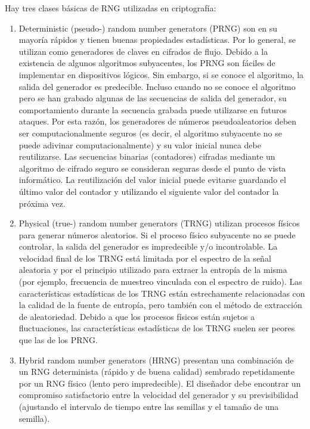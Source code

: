 			
			Hay tres clases básicas de RNG utilizadas en criptografía:
			
			\begin{enumerate}
				\item Deterministic (pseudo-) random number generators (PRNG) son en su mayoría rápidos y tienen buenas propiedades estadísticas. Por lo general, se utilizan como generadores de claves en cifrados de flujo. Debido a la existencia de algunos algoritmos subyacentes, los PRNG son fáciles de implementar en dispositivos lógicos. Sin embargo, si se conoce el algoritmo, la salida del generador es predecible. Incluso cuando no se conoce el algoritmo pero se han grabado algunas de las secuencias de salida del generador, su comportamiento durante la secuencia grabada puede utilizarse en futuros ataques. Por esta razón, los generadores de números pseudoaleatorios deben ser computacionalmente seguros (es decir, el algoritmo subyacente no se puede adivinar computacionalmente) y su valor inicial nunca debe reutilizarse. Las secuencias binarias (contadores) cifradas mediante un algoritmo de cifrado seguro se consideran seguras desde el punto de vista informático. La reutilización del valor inicial puede evitarse guardando el último valor del contador y utilizando el siguiente valor del contador la próxima vez.			
					
				
				\item Physical (true-) random number generators (TRNG) utilizan procesos físicos para generar números aleatorios. Si el proceso físico subyacente no se puede controlar, la salida del generador es impredecible y/o incontrolable. La velocidad final de los TRNG está limitada por el espectro de la señal aleatoria y por el principio utilizado para extraer la entropía de la misma (por ejemplo, frecuencia de muestreo vinculada con el espectro de ruido). Las características estadísticas de los TRNG están estrechamente relacionadas con la calidad de la fuente de entropía, pero también con el método de extracción de aleatoriedad. Debido a que los procesos físicos están sujetos a fluctuaciones, las características estadísticas de los TRNG suelen ser peores que las de los PRNG.
				
				\item Hybrid random number generators (HRNG) presentan una combinación de un RNG determinista (rápido y de buena calidad) sembrado repetidamente por un RNG físico (lento pero impredecible). El diseñador debe encontrar un compromiso satisfactorio entre la velocidad del generador y su previsibilidad (ajustando el intervalo de tiempo entre las semillas y el tamaño de una semilla).
			\end{enumerate}
			
